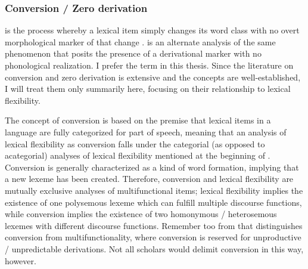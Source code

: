 \subsubsection{Conversion / Zero derivation}
\label{sec:2.3.1.7}

 is the process whereby a lexical item simply changes its word class with no overt morphological marker of that change \parencite[114]{Crystal2008}.  is an alternate analysis of the same phenomenon that posits the presence of a derivational marker with no phonological realization. I prefer the term  in this thesis. Since the literature on conversion and zero derivation is extensive and the concepts are well-established, I will treat them only summarily here, focusing on their relationship to lexical flexibility.

The concept of conversion is based on the premise that lexical items in a language are fully categorized for part of speech, meaning that an analysis of lexical flexibility as conversion falls under the categorial (as opposed to acategorial) analyses of lexical flexibility mentioned at the beginning of . Conversion is generally characterized as a kind of word formation, implying that a new lexeme has been created. Therefore, conversion and lexical flexibility are mutually exclusive analyses of multifunctional items; lexical flexibility implies the existence of one polysemous lexeme which can fulfill multiple discourse functions, while conversion implies the existence of two homonymous / heterosemous lexemes with different discourse functions. Remember too from  that \textcite{Lier2012} distinguishes conversion from multifunctionality, where conversion is reserved for unproductive / unpredictable derivations. Not all scholars would delimit conversion in this way, however.

